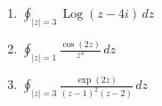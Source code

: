\documentclass[11pt]{article}
\newcommand{\ds}{\displaystyle}
\newcommand{\C}{\mathbb{C}}
\newcommand{\on}{\operatorname}
\newcommand{\Log}{\on{Log}}
\begin{document}




%

\begin{multicols}{3}
\begin{enumerate}
\setcounter{enumi}{\theenumCount}
\item $\ds \oint_{|z| = 3} \Log(z-4i) \, dz$
\item $\ds \oint_{|z|=1} \frac{\cos(2z)}{z^3} \, dz$
\item $\ds \oint_{|z|=3} \frac{\exp(2z)}{(z-1)^2(z-2)} \, dz$
\setcounter{enumCount}{\theenumi}
\end{enumerate}
\end{multicols}
\vfill
\vfill


%
%
%
\end{document}

